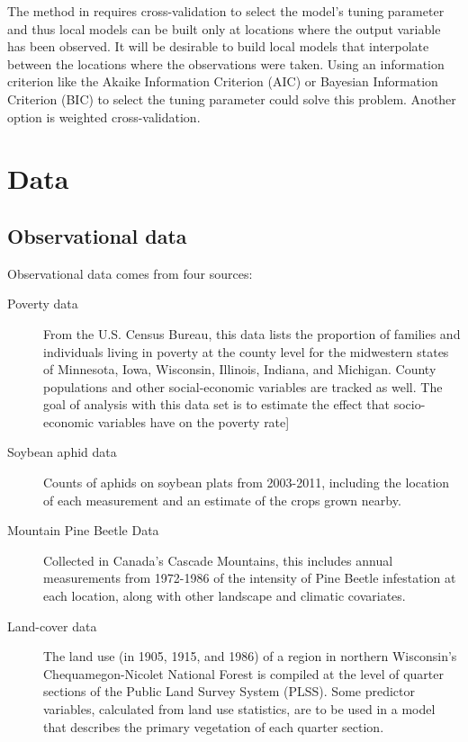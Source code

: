 \documentclass[authoryear ,review]{elsarticle}
\begin{document}
	The method in \cite{Wheeler:2009} requires cross-validation to select the model's tuning parameter and thus local models can be built only at locations where the output variable has been observed. It will be desirable to build local models that interpolate between the locations where the observations were taken. Using an information criterion like the Akaike Information Criterion (AIC) or Bayesian Information Criterion (BIC) to select the tuning parameter could solve this problem. Another option is weighted cross-validation.\\

\section{Data}
	\subsection{Observational data}
		Observational data comes from four sources:\\
		
		\begin{description}
			\item[Poverty data] From the U.S. Census Bureau, this data lists the proportion of families and individuals living in poverty at the county level for the midwestern states of Minnesota, Iowa, Wisconsin, Illinois, Indiana, and Michigan. County populations and other social-economic variables are tracked as well. The goal of analysis with this data set is to estimate the effect that socio-economic variables have on the poverty rate]
			\item[Soybean aphid data] Counts of aphids on soybean plats from 2003-2011, including the location of each measurement and an estimate of the crops grown nearby.
			\item[Mountain Pine Beetle Data] Collected in Canada's Cascade Mountains, this includes annual measurements from 1972-1986 of the intensity of Pine Beetle infestation at each location, along with other landscape and climatic covariates.
			\item[Land-cover data] The land use (in 1905, 1915, and 1986) of a region in northern Wisconsin's Chequamegon-Nicolet National Forest is compiled at the level of quarter sections of the Public Land Survey System (PLSS). Some predictor variables, calculated from land use statistics, are to be used in a model that describes the primary vegetation of each quarter section.
		\end{description}
  
\end{document}
